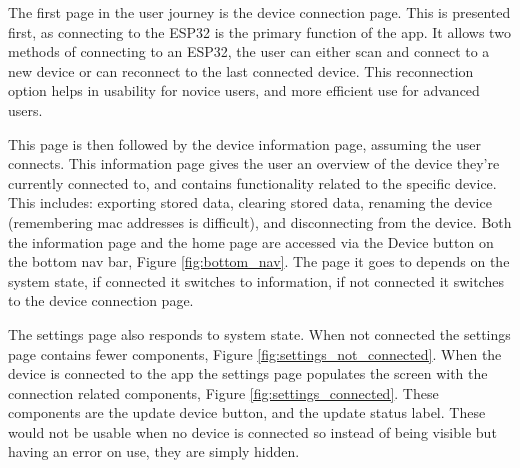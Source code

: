 \documentclass{l4proj}
\begin{document}
The first page in the user journey is the device connection page. This is presented first, as connecting to the ESP32 is the primary function of the app. It allows two methods of connecting to an ESP32, the user can either scan and connect to a new device or can reconnect to the last connected device. This reconnection option helps in usability for novice users, and more efficient use for advanced users.

This page is then followed by the device information page, assuming the user connects. This information page gives the user an overview of the device they're currently connected to, and contains functionality related to the specific device. This includes: exporting stored data, clearing stored data, renaming the device (remembering mac addresses is difficult), and disconnecting from the device. Both the information page and the home page are accessed via the Device button on the bottom nav bar, Figure \ref{fig:bottom_nav}. The page it goes to depends on the system state, if connected it switches to information, if not connected it switches to the device connection page.

The settings page also responds to system state. When not connected the settings page contains fewer components, Figure \ref{fig:settings_not_connected}. When the device is connected to the app the settings page populates the screen with the connection related components, Figure \ref{fig:settings_connected}. These components are the update device button, and the update status label. These would not be usable when no device is connected so instead of being visible but having an error on use, they are simply hidden.
\end{document}
